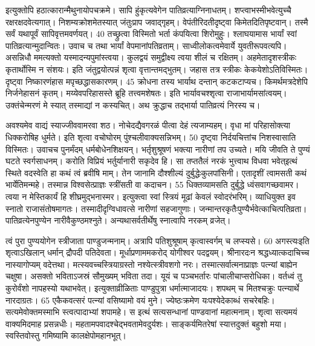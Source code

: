 इत्युक्तोपि हठात्कारान्मैथुनायोपचक्रमे।
 सापि हुंकृत्यवेगेन पातिव्रत्याग्निनाधतम्।
 शप्त्वाभस्मीभवेत्युच्चै रक्षरक्षदवेत्यगात्।
 निशम्यक्रोशमेतस्यात् जंतुःप्राप जवाद्गृहम्।
 वेपंतीरिदतीदृष्ट्वा किमेतदितिपृष्टवान्।
 तस्मै सर्वं यथापूर्वं सापिवृत्तमवर्णयत्।
 40 तच्छ्रुत्वा विस्मितो भर्ता कंपयित्वा शिरोमुहुः।
 श्लाघयामास भार्यां स्वां पातिव्रत्यान्मुदान्वितः।
 उवाच च तथा भार्यां वेपमानांपतिव्रताम्।
 साध्वीलोकत्वमेवार्ये युवतीरूपवत्यपि।
 असन्निधौ ममत्यक्तो यस्मादन्यपुमांस्त्वया।
 कुलद्वयं समुद्वीक्ष्य त्वया शीलं च रक्षितम्।
 अहमेतादृशस्त्रीकः कृतार्थोस्मि न संशयः।
 इति जंतुद्वयोत्पन्नं शृत्वा वृत्तान्तमद्भुतम्।
 जहास तत्र स्त्रीकः केकयेशोऽतिविस्मितः।
 दृष्ट्वा निष्कारणंहास मपृच्छद्धासकारणम्।
 45 क्रोधना तस्य भार्याथ दन्तान् कटकटाप्यच।
 किमर्थमत्रदेशेपि निर्जनेहासनं कृतम्।
 मय्येवपरिहासस्ते ब्रूहि तत्त्वमशेषतः।
 इति भार्यावचश्शृत्वा राजाभार्यामसांत्वयम्।
 उक्तंचेन्मरणं मे स्यात् तस्माद्यां न कस्यचित्।
 अथ क्रुद्धाच तद्भार्या पातिव्रत्यं निरस्य च।
 
अवश्यमेव वाद्यं स्याज्जीववामरवा शठ।
 नोचेदद्यैवगरळं पीत्वा देहं त्यजाम्यहम्।
 वृधा मां परिहासोक्त्या धिक्करोषिह धुर्मते।
 इति शृत्वा वचोघोरम् पुंश्चलीवाक्यसन्निभम्।
 50 दृष्ट्वा निर्दयचित्तांच निशस्वासाति विस्मितः।
 उवाचच पुनर्मंदम् धर्मबोधेनशिक्षयन्।
 भर्तृशुश्रूषणं भक्त्या नारीणां तप उच्यते।
 मयि जीवति ते पुण्यं घटते स्वर्गसाधनम्।
 करोति विप्रियं भर्तुर्यानारी सकृदेव हि।
 सा तप्ततैलं नरकं भुत्त्वाथ विधवा भवेत्इत्थं स्थिते वदस्वेति हा कथं त्वं ब्रवीषि माम्।
 तेन जानामि दौश्शील्यं दुर्बुद्धेःकुलपांसिनी।
 एतादृशीं त्वामसती कथं भार्येतिमन्महे।
 तस्मान्न विश्वसेत्प्राज्ञः स्त्रींसती वा कदाचन।
 55 धिक्तव्यामसति दुर्बुद्धे ध्वंसवागच्छवामर।
 त्वया न मेस्तिकार्यं हि शीघ्रमुद्भनास्मर।
 इत्युक्त्वा स्वां स्त्रियं मूढां केवलं स्वोदरंभरिम्।
 व्याधियुक्त इव स्नातो राजासंतोषमागतः।
 तस्मादीदृग्विधावत्से नारीणां सहजागुणाः।
 जन्मान्तरकृतैःपुण्यैर्भवेत्काचित्पतिव्रता।
 पातिव्रत्येनपुण्येन नारीवैकुण्ठमश्नुते।
 अन्यथासर्वतीर्थेषु स्नात्वापि नरकम् व्रजेत्।
 
त्वं पुरा पुण्ययोगेन स्त्रीजाता पाण्डुजन्मनाम्।
 अत्रापि पतिशुश्रूषाम् कृत्वास्वर्गम् च लप्स्यसे।
 60 अगस्त्यःइति शृत्वाऽखिलान् धर्मान् द्रौपदी पतिदेवता।
 मूर्धाप्रणाममकरोद् योगीश्वर पदद्वयम्।
 श्रीनारदःन श्रद्धध्यात्कदाचिच्च नास्यागोप्यम् वदेत्तथा।
 मत्स्यवच्चस्त्रियाग्रस्तो नश्येत्स्त्रीवशगो नरः।
 तस्मात्सर्वात्मनाप्राज्ञः पत्न्यां बाह्येन चक्षुषा।
 असक्तो भविताऽजस्रं सौमुख्यम् भविता तदा।
 यूयं च पञ्चभर्तारः पांचालीचाप्सरोधिका।
 वर्तध्वं तु कुरोर्वंशो नापहस्यो यथाभवेत्।
 इत्युक्ताव्रीळिताः पाण्डुपुत्रा धर्मात्माजादयः।
 शपथम् च मितश्चक्रुः पत्न्यार्थे नारदाग्रतः।
 65 एकैकवत्सरं पत्न्यां वसिष्यामो वयं मुने।
 ज्येष्ठःक्रमेण यःपश्येदेकाब्धं सचरेबहिः।
 सत्यमेवोक्तमस्माभि स्त्वत्पादाभ्यां शपामहे।
 स इत्थं सत्यसन्धानां पाण्डवानां महात्मनाम्।
 शृत्वा सत्यमयं वाक्यमिदमाह प्रसन्नधीः।
 महतामपवादश्चेद्भवतामेवदुर्यशः।
 साङ्कर्यमितरेषां स्यात्तदुक्तं बहुशो मया।
 स्वस्तिवोस्तु गमिष्यामि कालक्षेपोमहानभूत्।
 
